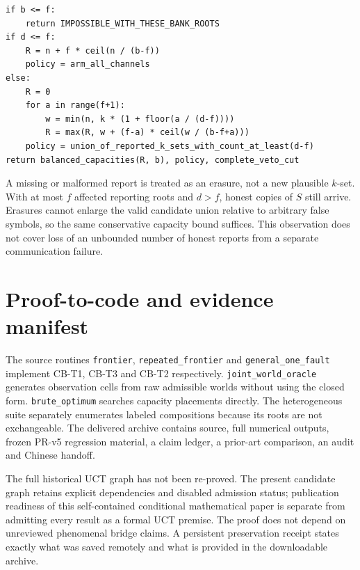 \documentclass[11pt,a4paper]{article}
\theoremstyle{definition}\newtheorem{definition}{Definition}
\begin{document}
\begin{lstlisting}[caption={Separable-role synthesis; all inputs must refer to one validated episode.}]
if b <= f:
    return IMPOSSIBLE_WITH_THESE_BANK_ROOTS
if d <= f:
    R = n + f * ceil(n / (b-f))
    policy = arm_all_channels
else:
    R = 0
    for a in range(f+1):
        w = min(n, k * (1 + floor(a / (d-f))))
        R = max(R, w + (f-a) * ceil(w / (b-f+a)))
    policy = union_of_reported_k_sets_with_count_at_least(d-f)
return balanced_capacities(R, b), policy, complete_veto_cut
\end{lstlisting}
A missing or malformed report is treated as an erasure, not a new plausible $k$-set. With at most $f$ affected reporting roots and $d>f$, honest copies of $S$ still arrive. Erasures cannot enlarge the valid candidate union relative to arbitrary false symbols, so the same conservative capacity bound suffices. This observation does not cover loss of an unbounded number of honest reports from a separate communication failure.

\section{Proof-to-code and evidence manifest}
The source routines \texttt{frontier}, \texttt{repeated\_frontier} and \texttt{general\_one\_fault} implement CB-T1, CB-T3 and CB-T2 respectively. \texttt{joint\_world\_oracle} generates observation cells from raw admissible worlds without using the closed form. \texttt{brute\_optimum} searches capacity placements directly. The heterogeneous suite separately enumerates labeled compositions because its roots are not exchangeable. The delivered archive contains source, full numerical outputs, frozen PR-v5 regression material, a claim ledger, a prior-art comparison, an audit and Chinese handoff.

The full historical UCT graph has not been re-proved. The present candidate graph retains explicit dependencies and disabled admission status; publication readiness of this self-contained conditional mathematical paper is separate from admitting every result as a formal UCT premise. The proof does not depend on unreviewed phenomenal bridge claims. A persistent preservation receipt states exactly what was saved remotely and what is provided in the downloadable archive.
\end{document}
